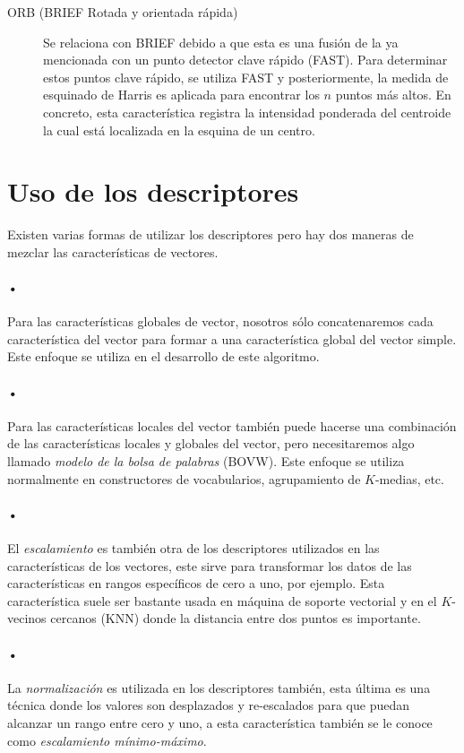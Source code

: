 \begin{description}
\item[ORB (BRIEF Rotada y orientada rápida)]{Se relaciona con BRIEF debido a
que esta es una fusión de la ya mencionada con un punto detector clave rápido (FAST). Para determinar estos puntos clave rápido, se utiliza FAST y posteriormente, la medida de esquinado de Harris es aplicada para encontrar los $n$ puntos más altos. En concreto, esta característica registra la intensidad ponderada del centroide la cual está localizada en la esquina de un centro.}
\end{description}

\section{Uso de los descriptores}
Existen varias formas de utilizar los descriptores pero hay dos maneras de mezclar las características de vectores.

\paragraph{•} Para las características globales de vector, nosotros sólo concatenaremos cada característica del vector para formar a una característica global del vector simple. Este enfoque se utiliza en el desarrollo de este algoritmo.

\paragraph{•} Para las características locales del vector también puede hacerse una combinación de las características locales y globales del vector, pero necesitaremos algo llamado \emph{modelo de la bolsa de palabras} (BOVW). Este enfoque se utiliza normalmente en constructores de vocabularios, agrupamiento de $K$-medias, etc.

\paragraph{•} El \emph{escalamiento} es también otra de los descriptores utilizados en las características de los vectores, este sirve para transformar los datos de las características en rangos específicos de cero a uno, por ejemplo. Esta característica suele ser bastante usada en máquina de soporte vectorial y en el $K$-vecinos cercanos (KNN) donde la distancia entre dos puntos es importante.

\paragraph{•} La \emph{normalización} es utilizada en los descriptores también, esta última es una técnica donde los valores son desplazados y re-escalados  para que puedan alcanzar un rango entre cero y uno, a esta característica también se le conoce como \emph{escalamiento mínimo-máximo}.

